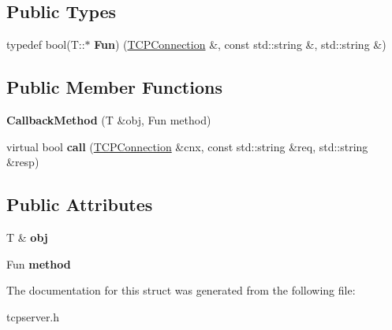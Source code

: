 \subsection*{Public Types}
\begin{DoxyCompactItemize}
\item 
typedef bool(T\+::$\ast$ {\bfseries Fun}) (\hyperlink{classcppu_1_1TCPConnection}{T\+C\+P\+Connection} \&, const std\+::string \&, std\+::string \&)\hypertarget{structcppu_1_1TCPServer_1_1CallbackMethod_a6f71d878bd072aadf40d96d1db18eecd}{}\label{structcppu_1_1TCPServer_1_1CallbackMethod_a6f71d878bd072aadf40d96d1db18eecd}

\end{DoxyCompactItemize}
\subsection*{Public Member Functions}
\begin{DoxyCompactItemize}
\item 
{\bfseries Callback\+Method} (T \&obj, Fun method)\hypertarget{structcppu_1_1TCPServer_1_1CallbackMethod_a0c6ceee6db8c67ef56fb26d1df52140f}{}\label{structcppu_1_1TCPServer_1_1CallbackMethod_a0c6ceee6db8c67ef56fb26d1df52140f}

\item 
virtual bool {\bfseries call} (\hyperlink{classcppu_1_1TCPConnection}{T\+C\+P\+Connection} \&cnx, const std\+::string \&req, std\+::string \&resp)\hypertarget{structcppu_1_1TCPServer_1_1CallbackMethod_a0c11039d0ed983c03a614d0764df3793}{}\label{structcppu_1_1TCPServer_1_1CallbackMethod_a0c11039d0ed983c03a614d0764df3793}

\end{DoxyCompactItemize}
\subsection*{Public Attributes}
\begin{DoxyCompactItemize}
\item 
T \& {\bfseries obj}\hypertarget{structcppu_1_1TCPServer_1_1CallbackMethod_ae480535d346efc119fb5c43880f349c8}{}\label{structcppu_1_1TCPServer_1_1CallbackMethod_ae480535d346efc119fb5c43880f349c8}

\item 
Fun {\bfseries method}\hypertarget{structcppu_1_1TCPServer_1_1CallbackMethod_aab858a039ddee71fb65a0e35c173f067}{}\label{structcppu_1_1TCPServer_1_1CallbackMethod_aab858a039ddee71fb65a0e35c173f067}

\end{DoxyCompactItemize}


The documentation for this struct was generated from the following file\+:\begin{DoxyCompactItemize}
\item 
tcpserver.\+h\end{DoxyCompactItemize}
